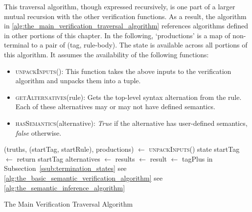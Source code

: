 This traversal algorithm, though expressed recursively, is one part of a larger mutual recursion with the other verification functions. 
As a result, the algorithm in \autoref{alg:the_main_verification_traversal_algorithm} references algorithms defined in other portions of this chapter.
In the following, `productions' is a map of non-terminal to a pair of (tag, rule-body). 
The state is available across all portions of this algorithm.
It assumes the availability of the following functions:
\begin{itemize}
    \item \textsc{unpackInputs}(): This function takes the above inputs to the verification algorithm and unpacks them into a tuple.
    \item \textsc{getAlternatives}(rule): Gets the top-level syntax alternation from the rule. 
    Each of these alternatives may or may not have defined semantics.
    \item \textsc{hasSemantics}(alternative): \textit{True} if the alternative has user-defined semantics, \textit{false} otherwise.
\end{itemize}

\begin{algorithm}[!htb]
\begin{algorithmic}
\State
\State (truths, (startTag, startRule), productions) $\gets$ \textsc{unpackInputs}()
\Comment state
\State
\State startTag $\gets$ 
\State return startTag
\State
{}
    \State alternatives $\gets$ 
    \State results $\gets$ 
    \State result $\gets$ 
    \Comment tagPlus in Subsection~\ref{ssub:termination_states}
    \State {}
\EndFunction
\State
{}
        \State {}
        \Comment see \autoref{alg:the_basic_semantic_verification_algorithm}
    \Else
        \State {}
        \Comment see \autoref{alg:the_semantic_inference_algorithm}
    \EndIf
\EndFunction
\end{algorithmic}
\caption{The Main Verification Traversal Algorithm}
\label{alg:the_main_verification_traversal_algorithm}
\end{algorithm}

